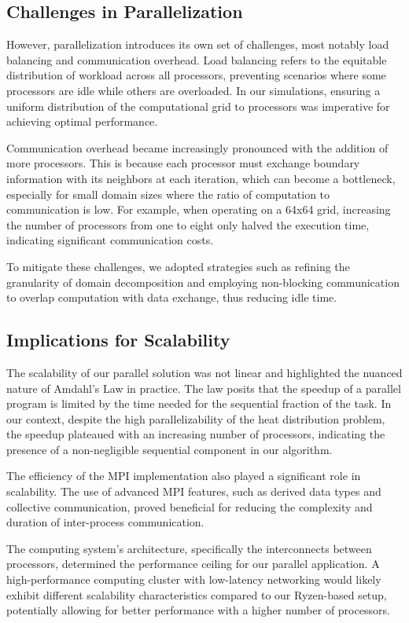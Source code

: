 \documentclass[11pt]{article}
\begin{document}
    \subsection{Challenges in Parallelization}
    However, parallelization introduces its own set of challenges, most notably load balancing and communication overhead. Load balancing refers to the equitable distribution of workload across all processors, preventing scenarios where some processors are idle while others are overloaded. In our simulations, ensuring a uniform distribution of the computational grid to processors was imperative for achieving optimal performance.

    Communication overhead became increasingly pronounced with the addition of more processors. This is because each processor must exchange boundary information with its neighbors at each iteration, which can become a bottleneck, especially for small domain sizes where the ratio of computation to communication is low. For example, when operating on a 64x64 grid, increasing the number of processors from one to eight only halved the execution time, indicating significant communication costs.

    To mitigate these challenges, we adopted strategies such as refining the granularity of domain decomposition and employing non-blocking communication to overlap computation with data exchange, thus reducing idle time.

    \subsection{Implications for Scalability}
    The scalability of our parallel solution was not linear and highlighted the nuanced nature of Amdahl's Law in practice. The law posits that the speedup of a parallel program is limited by the time needed for the sequential fraction of the task. In our context, despite the high parallelizability of the heat distribution problem, the speedup plateaued with an increasing number of processors, indicating the presence of a non-negligible sequential component in our algorithm.

    The efficiency of the MPI implementation also played a significant role in scalability. The use of advanced MPI features, such as derived data types and collective communication, proved beneficial for reducing the complexity and duration of inter-process communication.

    The computing system's architecture, specifically the interconnects between processors, determined the performance ceiling for our parallel application. A high-performance computing cluster with low-latency networking would likely exhibit different scalability characteristics compared to our Ryzen-based setup, potentially allowing for better performance with a higher number of processors.
\end{document}
